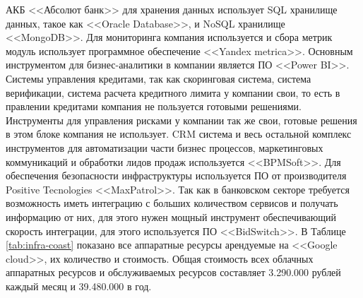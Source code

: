\documentclass[14pt, a4paper]{extarticle}
\begin{document}
АКБ <<Абсолют банк>> для хранения данных использует SQL хранилище данных,
такое как <<Oracle Database>>, и NoSQL хранилище <<MongoDB>>. Для мониторинга
компания используется и сбора метрик модуль использует программное обеспечение
<<Yandex metrica>>\;\cite{absolut-infrastructure-usage}. Основным инструментом
для бизнес-аналитики в компании является ПО <<Power BI>>. Системы управления
кредитами, так как скоринговая  система, система верификации, система расчета
кредитного лимита у компании свои, то есть в правлении кредитами компания не
пользуется готовыми решениями. Инструменты для управления рисками у компании
так же свои, готовые решения в этом блоке компания не использует. CRM система
и весь остальной комплекс инструментов для автоматизации части
бизнес процессов, маркетинговых коммуникаций и обработки лидов
продаж используется <<BPMSoft>>\;\cite{BPMSoft-usage}. Для обеспечения
безопасности инфраструктуры используется ПО от производителя Positive
Tecnologies <<MaxPatrol>>\;\cite{absolut-MaxPatrol-usage}. Так как в банковском
секторе требуется возможность иметь интеграцию с больших количеством
сервисов и получать информацию от них, для этого нужен мощный инструмент
обеспечивающий скорость интеграции, для этого используется ПО <<BidSwitch>>. В
Таблице \ref{tab:infra-coast} показано все аппаратные ресурсы арендуемые на
<<Google cloud>>, их количество и стоимость. Общая стоимость всех облачных
аппаратных ресурсов и обслуживаемых ресурсов составляет 3.290.000 рублей каждый
месяц и 39.480.000 в год.
\end{document}
